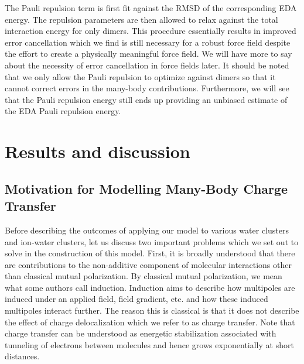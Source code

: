 \documentclass[journal=jacsat,manuscript=article]{achemso}
\begin{document}
The Pauli repulsion term is first fit against the RMSD of the corresponding EDA energy.
The repulsion parameters are then allowed to relax against the total interaction energy
for only dimers. This procedure essentially results in improved error cancellation
which we find is still necessary for a robust force field despite the effort
to create a physically meaningful force field. We will have more to say about the necessity
of error cancellation in force fields later. It should be noted that we only allow
the Pauli repulsion to optimize against dimers so that it cannot correct errors
in the many-body contributions. Furthermore, we will see that the Pauli repulsion energy
still ends up providing an unbiased estimate of the EDA Pauli repulsion energy.

\section*{Results and discussion}
\subsection*{Motivation for Modelling Many-Body Charge Transfer}

Before describing the outcomes of applying our model to various water clusters and
ion-water clusters, let us discuss two important problems which we set out to solve
in the construction of this model. First, it is broadly understood that there are
contributions to the non-additive component of molecular interactions other than
classical mutual polarization. By classical mutual polarization, we mean what some
authors call induction.\cite{herman2023accurate} Induction aims to describe
how multipoles are induced under an applied field, field gradient, etc.
and how these induced multipoles interact further. The reason this is classical
is that it does not describe the effect of charge delocalization which we refer to
as charge transfer. Note that charge transfer can be understood as energetic
stabilization associated with tunneling of electrons between molecules
and hence grows exponentially at short distances.\cite{misquitta2013charge}
\end{document}
